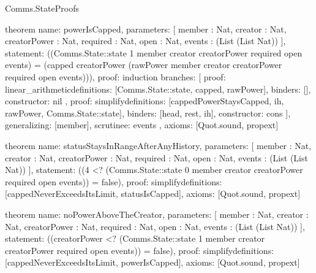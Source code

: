 \begin{lexlean}{Comms.StateProofs}
\begin{semanticmodule}
theorem{
  name: powerIsCapped,
  parameters: [
    member : Nat,
    creator : Nat,
    creatorPower : Nat,
    required : Nat,
    open : Nat,
    events : (List (List Nat))
  ],
  statement: ((Comms.State::state 1 member creator creatorPower required open events) = (capped creatorPower (rawPower member creator creatorPower required open events))),
  proof: induction{
    branches: [
      {
        proof: linear_arithmetic{definitions: [Comms.State::state, capped, rawPower]},
        binders: [],
        constructor: nil
      },
      {
        proof: simplify{definitions: [cappedPowerStaysCapped, ih, rawPower, Comms.State::state]},
        binders: [head, rest, ih],
        constructor: cons
      }
    ],
    generalizing: [member],
    scrutinee: events
  },
  axioms: [Quot.sound, propext]
}

theorem{
  name: statusStaysInRangeAfterAnyHistory,
  parameters: [
    member : Nat,
    creator : Nat,
    creatorPower : Nat,
    required : Nat,
    open : Nat,
    events : (List (List Nat))
  ],
  statement: ((4 <? (Comms.State::state 0 member creator creatorPower required open events)) = false),
  proof: simplify{definitions: [cappedNeverExceedsItsLimit, statusIsCapped]},
  axioms: [Quot.sound, propext]
}

theorem{
  name: noPowerAboveTheCreator,
  parameters: [
    member : Nat,
    creator : Nat,
    creatorPower : Nat,
    required : Nat,
    open : Nat,
    events : (List (List Nat))
  ],
  statement: ((creatorPower <? (Comms.State::state 1 member creator creatorPower required open events)) = false),
  proof: simplify{definitions: [cappedNeverExceedsItsLimit, powerIsCapped]},
  axioms: [Quot.sound, propext]
}
\end{semanticmodule}
\end{lexlean}
